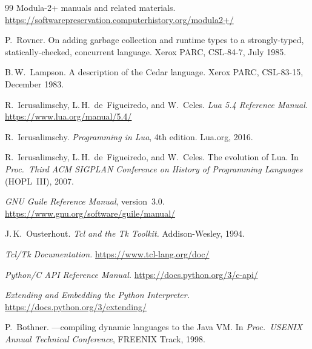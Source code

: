 \documentclass[11pt]{article}
\begin{document}
\begin{thebibliography}{99}
Modula-2+ manuals and related materials.
\newblock \url{https://softwarepreservation.computerhistory.org/modula2+/}


P.~Rovner.
\newblock On adding garbage collection and runtime types to a
  strongly-typed, statically-checked, concurrent language.
\newblock Xerox PARC, CSL-84-7, July 1985.

B.\,W.\ Lampson.
\newblock A description of the {Cedar} language.
\newblock Xerox PARC, CSL-83-15, December 1983.


R.~Ierusalimschy, L.\,H.\ de~Figueiredo, and W.~Celes.
\newblock \emph{Lua 5.4 Reference Manual.}
\newblock \url{https://www.lua.org/manual/5.4/}

R.~Ierusalimschy.
\newblock \emph{Programming in Lua}, 4th edition.
\newblock Lua.org, 2016.

R.~Ierusalimschy, L.\,H.\ de~Figueiredo, and W.~Celes.
\newblock The evolution of {Lua}.
\newblock In \emph{Proc.\ Third ACM SIGPLAN Conference on History of
  Programming Languages} (HOPL~III), 2007.


\emph{GNU Guile Reference Manual}, version~3.0.
\newblock \url{https://www.gnu.org/software/guile/manual/}


J.\,K.\ Ousterhout.
\newblock \emph{Tcl and the Tk Toolkit.}
\newblock Addison-Wesley, 1994.

\emph{Tcl/Tk Documentation.}
\newblock \url{https://www.tcl-lang.org/doc/}


\emph{Python/C API Reference Manual.}
\newblock \url{https://docs.python.org/3/c-api/}

\emph{Extending and Embedding the Python Interpreter.}
\newblock \url{https://docs.python.org/3/extending/}


P.~Bothner.
---compiling dynamic languages to the {Java VM}.
\newblock In \emph{Proc.\ USENIX Annual Technical Conference},
  FREENIX Track, 1998.


\end{thebibliography}
\end{document}
